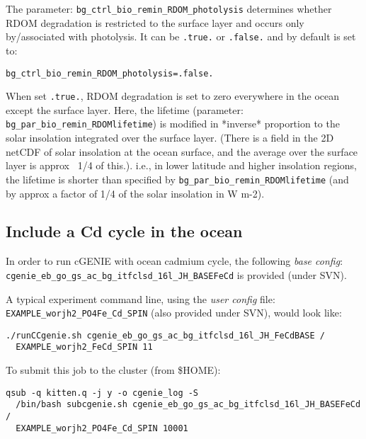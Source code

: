 \documentclass[10pt,twoside]{article}
\begin{document}
The parameter: \texttt{bg\_ctrl\_bio\_remin\_RDOM\_photolysis} determines whether RDOM degradation is restricted to the surface layer and occurs only by/associated with photolysis. It can be \texttt{.true.} or \texttt{.false.} and by default is set to:
\vspace{-10pt}\begin{verbatim}bg_ctrl_bio_remin_RDOM_photolysis=.false.\end{verbatim}\vspace{-10pt}
When set \texttt{.true.}, RDOM degradation is set to zero everywhere in the ocean except the surface layer. Here, the lifetime (parameter: \texttt{bg\_par\_bio\_remin\_RDOMlifetime}) is modified in *inverse* proportion to the solar insolation integrated over the surface layer. (There is a field in the 2D netCDF of solar insolation at the ocean surface, and the average over the surface layer is approx ~1/4 of this.). i.e., in lower latitude and higher insolation regions, the lifetime is shorter than specified by \texttt{bg\_par\_bio\_remin\_RDOMlifetime} (and by approx a factor of 1/4 of the solar insolation in W m-2).



\subsection{Include a Cd cycle in the ocean}\label{Include a Cd cycle in the ocean}


In order to run cGENIE with ocean cadmium cycle, the following \textit{base config}: \\ \texttt{cgenie\_eb\_go\_gs\_ac\_bg\_itfclsd\_16l\_JH\_BASEFeCd} is provided (under SVN).

A typical experiment command line, using the \textit{user config} file: \texttt{EXAMPLE\_worjh2\_PO4Fe\_Cd\_SPIN} (also provided under SVN), would look like:
\vspace{-5.5pt}\begin{verbatim}
./runCCgenie.sh cgenie_eb_go_gs_ac_bg_itfclsd_16l_JH_FeCdBASE /
  EXAMPLE_worjh2_FeCd_SPIN 11
\end{verbatim}\vspace{-5.5pt}

To submit this job to the cluster (from \$HOME):
\vspace{-5.5pt}\begin{verbatim}
qsub -q kitten.q -j y -o cgenie_log -S
  /bin/bash subcgenie.sh cgenie_eb_go_gs_ac_bg_itfclsd_16l_JH_BASEFeCd /
  EXAMPLE_worjh2_PO4Fe_Cd_SPIN 10001
\end{verbatim}\vspace{-5.5pt}
\end{document}
